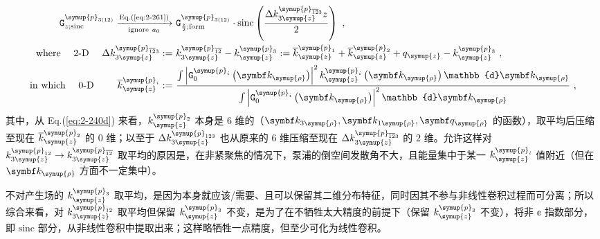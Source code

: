\begin{subequations} \label{eq:2-283}
	\abovedisplayskip=13pt
	\belowdisplayskip=13pt
	\begin{align}
		{\mathtt{G}}^{\symup{p}_{3(12)}}_{z;\text{sinc}} \xrightarrow[\text{ignore}\ a_0]{\text{Eq.(\ref{eq:2-261})}} &\ {\mathtt{G}}^{\symup{p}_{3(12)}}_{\frac{ z }{ 2 };\text{form}} \cdot \text{sinc} \left( \frac{ \Delta k^{\symup{p}_{\overline{12}3}}_{3\symup{z}} z }{ 2 } \right) \label{eq:2-283a}~, \\ \text{where}\ \ \ \ \text{2-D} \ \ \ \ \Delta k^{\symup{p}_{\overline{12}3}}_{3\symup{z}} :=&\ k^{\symup{p}_{\overline{12}}}_{3\symup{z}} - k^{\symup{p}_{3}}_{\symup{z}} := \overline{k}^{\symup{p}_{1}}_{\symup{z}} + \overline{k}^{\symup{p}_{2}}_{\symup{z}} + q_{\symup{z}} - k^{\symup{p}_{3}}_{\symup{z}} \label{eq:2-283b}~, \\ \text{in which}\ \ \ \ \text{0-D} \hspace{2.42em} \overline{k}^{\symup{p}_{i}}_{\symup{z}} :=&\ \frac{ \int \left| {\mathtt{G}}^{\symup{p}_{i}}_{0} \left( \symbf k_{\symup{\rho}} \right) \right|^2 k^{\symup{p}_{i}}_{\symup{z}} \left( \symbf k_{\symup{\rho}} \right) \mathbb{d}{\symbf k_{\symup{\rho}}} }{ \int \left| {\mathtt{G}}^{\symup{p}_{i}}_{0} \left( \symbf k_{\symup{\rho}} \right) \right|^2 \mathbb{d}{\symbf k_{\symup{\rho}}} } \label{eq:2-283c}~,
	\end{align}
\end{subequations}
其中，从 Eq.(\ref{eq:2-240d}) 来看，$k^{\symup{p}_{2}}_{\symup{z}}$ 本身是 $6$ 维的（$\symbf k_{3\symup{\rho}}, \symbf k_{1\symup{\rho}}, \symbf q_{\symup{\rho}}$ 的函数），取平均后压缩至现在 $\overline{k}^{\symup{p}_{2}}_{\symup{z}}$ 的 $0$ 维；以至于 $\Delta k^{\symup{p}_{123}}_{3\symup{z}}$ 也从原来的 $6$ 维压缩至现在 $\Delta k^{\symup{p}_{\overline{12}3}}_{3\symup{z}}$ 的 $2$ 维。允许这样对 $k^{\symup{p}_{12}}_{3\symup{z}} \to k^{\symup{p}_{\overline{12}}}_{3\symup{z}}$ 取平均的原因是，在非紧聚焦的情况下，泵浦的倒空间发散角不大，且能量集中于某一 $k^{\symup{p}_{i}}_{\symup{z}}$ 值附近（但在 $\symbf k_{\symup{\rho}}$ 方面不一定集中）。

不对产生场的 $k^{\symup{p}_{3}}_{\symup{z}}$ 取平均，是因为本身就应该/需要、且可以保留其二维分布特征，同时因其不参与非线性卷积过程而可分离；所以综合来看，对 $k^{\symup{p}_{12}}_{3\symup{z}}$ 取平均但保留 $k^{\symup{p}_{3}}_{\symup{z}}$ 不变，是为了在不牺牲太大精度的前提下（保留 $k^{\symup{p}_{3}}_{\symup{z}}$ 不变），将非 $\mathbb{e}$ 指数部分，即 $\text{sinc}$ 部分，从非线性卷积中提取出来；这样略牺牲一点精度，但至少可化为线性卷积。

